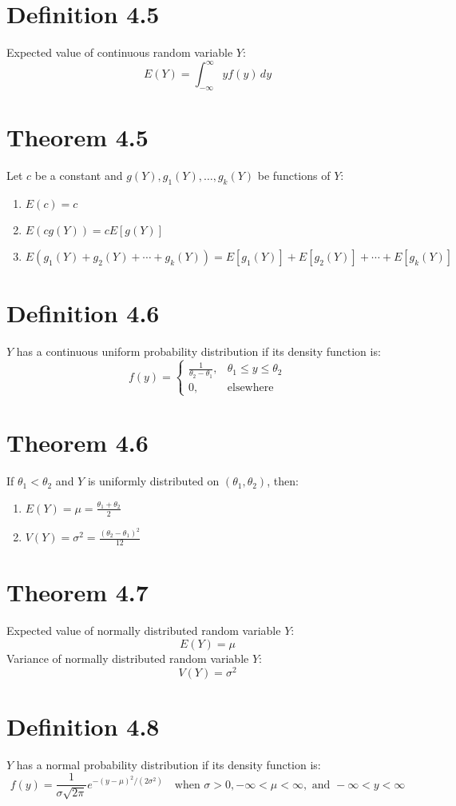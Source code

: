 \documentclass[12pt]{article}
\begin{document}
\section{Definition 4.5}
Expected value of continuous random variable $Y$:
\[
E(Y) = \int_{-\infty}^{\infty} y f(y)\,dy
\]

\section{Theorem 4.5}
Let $c$ be a constant and $g(Y), g_1(Y), \ldots, g_k(Y)$ be functions of $Y$:
\begin{enumerate}
  \item $E(c) = c$
  \item $E(cg(Y)) = cE[g(Y)]$
  \item $E(g_1(Y) + g_2(Y) + \cdots + g_k(Y)) = E[g_1(Y)] + E[g_2(Y)] + \cdots + E[g_k(Y)]$
\end{enumerate}

\section{Definition 4.6}
$Y$ has a continuous uniform probability distribution if its density function is:
\[
f(y) = \begin{cases} \frac{1}{\theta_2 - \theta_1}, & \theta_1 \leq y \leq \theta_2 \\ 0, & \text{elsewhere} \end{cases}
\]

\section{Theorem 4.6}
If $\theta_1 < \theta_2$ and $Y$ is uniformly distributed on $(\theta_1, \theta_2)$, then:
\begin{enumerate}
  \item $E(Y) = \mu = \frac{\theta_1 + \theta_2}{2}$
  \item $V(Y) = \sigma^2 = \frac{(\theta_2 - \theta_1)^2}{12}$
\end{enumerate}


\section{Theorem 4.7}
Expected value of normally distributed random variable $Y$:
\[
E(Y) = \mu
\]
Variance of normally distributed random variable $Y$:
\[
V(Y) = \sigma^2
\]
\section{Definition 4.8}
$Y$ has a normal probability distribution if its density function is:
\[
f(y) = \frac{1}{\sigma\sqrt{2\pi}} e^{-(y-\mu)^2/(2\sigma^2)} \quad \text{when } \sigma > 0, -\infty < \mu < \infty, \text{ and } -\infty < y < \infty
\]
\end{document}
